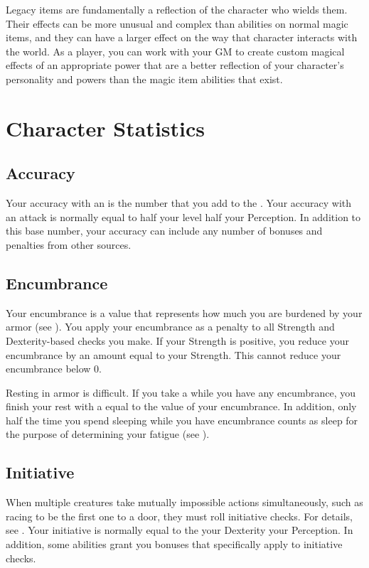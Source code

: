            Legacy items are fundamentally a reflection of the character who wields them.
            Their effects can be more unusual and complex than abilities on normal magic items, and they can have a larger effect on the way that character interacts with the world.
            As a player, you can work with your GM to create custom magical effects of an appropriate power that are a better reflection of your character's personality and powers than the magic item abilities that exist.

\section{Character Statistics}\label{Character Statistics}

    \subsection{Accuracy}\label{Accuracy}
        Your accuracy with an  is the number that you add to the .
        Your accuracy with an attack is normally equal to half your level \add half your Perception.
        In addition to this base number, your accuracy can include any number of bonuses and penalties from other sources.

    \subsection{Encumbrance}\label{Encumbrance}
        Your encumbrance is a value that represents how much you are burdened by your armor (see ).
        You apply your encumbrance as a penalty to all Strength and Dexterity-based checks you make.
        If your Strength is positive, you reduce your encumbrance by an amount equal to your Strength.
        This cannot reduce your encumbrance below 0.

        Resting in armor is difficult.
        If you take a  while you have any encumbrance, you finish your rest with a  equal to the value of your encumbrance.
        In addition, only half the time you spend sleeping while you have encumbrance counts as sleep for the purpose of determining your fatigue (see ).

    \subsection{Initiative}\label{Initiative}
        When multiple creatures take mutually impossible actions simultaneously, such as racing to be the first one to a door, they must roll initiative checks.
        For details, see .
        Your initiative is normally equal to the your Dexterity \add your Perception.
        In addition, some abilities grant you bonuses that specifically apply to initiative checks.

